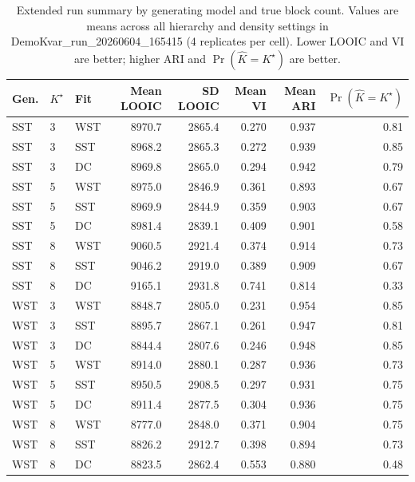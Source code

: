 \begin{table}[htbp]
\centering
\caption{Extended run summary by generating model and true block count. Values are means across all hierarchy and density settings in DemoKvar\_run\_20260604\_165415 (4 replicates per cell). Lower LOOIC and VI are better; higher ARI and $\Pr(\hat K=K^\star)$ are better.}
\label{tab:extended-overall-by-k}
\begin{tabular}{lllrrrrr}
\toprule
Gen. & $K^\star$ & Fit & Mean LOOIC & SD LOOIC & Mean VI & Mean ARI & $\Pr(\hat K=K^\star)$ \\
\midrule
SST & 3 & WST & 8970.7 & 2865.4 & 0.270 & 0.937 & 0.81 \\
SST & 3 & SST & 8968.2 & 2865.3 & 0.272 & 0.939 & 0.85 \\
SST & 3 & DC & 8969.8 & 2865.0 & 0.294 & 0.942 & 0.79 \\
SST & 5 & WST & 8975.0 & 2846.9 & 0.361 & 0.893 & 0.67 \\
SST & 5 & SST & 8969.9 & 2844.9 & 0.359 & 0.903 & 0.67 \\
SST & 5 & DC & 8981.4 & 2839.1 & 0.409 & 0.901 & 0.58 \\
SST & 8 & WST & 9060.5 & 2921.4 & 0.374 & 0.914 & 0.73 \\
SST & 8 & SST & 9046.2 & 2919.0 & 0.389 & 0.909 & 0.67 \\
SST & 8 & DC & 9165.1 & 2931.8 & 0.741 & 0.814 & 0.33 \\
WST & 3 & WST & 8848.7 & 2805.0 & 0.231 & 0.954 & 0.85 \\
WST & 3 & SST & 8895.7 & 2867.1 & 0.261 & 0.947 & 0.81 \\
WST & 3 & DC & 8844.4 & 2807.6 & 0.246 & 0.948 & 0.85 \\
WST & 5 & WST & 8914.0 & 2880.1 & 0.287 & 0.936 & 0.73 \\
WST & 5 & SST & 8950.5 & 2908.5 & 0.297 & 0.931 & 0.75 \\
WST & 5 & DC & 8911.4 & 2877.5 & 0.304 & 0.936 & 0.75 \\
WST & 8 & WST & 8777.0 & 2848.0 & 0.371 & 0.904 & 0.75 \\
WST & 8 & SST & 8826.2 & 2912.7 & 0.398 & 0.894 & 0.73 \\
WST & 8 & DC & 8823.5 & 2862.4 & 0.553 & 0.880 & 0.48 \\
\bottomrule
\end{tabular}
\end{table}
